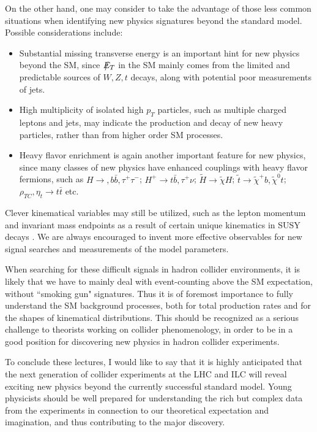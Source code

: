 \documentclass[12pt,prd,aps,floats,preprintnumbers,preprint,superscriptaddress,floatfix,nofootinbib]{revtex4}
\newcommand{ \slashchar }[1]{\setbox0=\hbox{$#1$}   %
   \dimen0=\wd0                                     %
   \setbox1=\hbox{/} \dimen1=\wd1                   %
   \ifdim\dimen0>\dimen1                            %
      \rlap{\hbox to \dimen0{\hfil/\hfil}}          %
      #1                                            %
   \else                                            %
      \rlap{\hbox to \dimen1{\hfil$#1$\hfil}}       %
      /                                             %
   \fi}                                             %
\def\etmiss{\slashchar{E}_{T}}
\def\pt{p_T^{}}
\begin{document}
On the other hand, one  may consider to take the advantage 
of those less common situations when identifying new physics signatures 
beyond the standard model. Possible considerations include:
\begin{itemize}
\item Substantial missing transverse energy is an important hint for new
physics beyond the SM, since $\etmiss$ in the SM  mainly comes from the
limited and predictable sources of $W,Z,t$ decays, 
along with potential poor measurements of jets.
%
\item High multiplicity of isolated high $\pt$ particles, such as multiple 
charged leptons and jets, may indicate the production and decay of
new heavy particles, rather than from higher order SM processes.
\item Heavy flavor enrichment is again another important feature
for new physics, since many  classes of new physics have enhanced
couplings with heavy flavor fermions, such as $H\to, b\bar b, \tau^+\tau^-$; 
$H^+ \to t\bar b, \tau^+\nu$; $\tilde H \to \tilde\chi H$;  
$\tilde t \to \tilde\chi^+ b, \tilde\chi^0 t$;
$\rho^{}_{TC}, \eta_{t}^{} \to t\bar t$ etc.
\end{itemize}
Clever kinematical variables may still be utilized, such as the lepton momentum
and invariant mass endpoints as a result of certain unique kinematics in SUSY
decays \cite{endpoint}.  
We are always encouraged to invent more effective  observables for new
signal searches and measurements of the model parameters. 

When searching for these difficult signals
in hadron collider environments, it is likely that we have
to mainly deal with event-counting above the SM expectation, without
``smoking gun" signatures. Thus it is of
foremost importance to fully understand the SM background 
processes, both for total 
production rates and for the shapes of kinematical distributions. 
This should be recognized as a serious challenge to theorists working
on collider phenomenology, in order to be in a good position for discovering 
new physics in hadron collider experiments.

To conclude these lectures, I would like to say  that it is highly anticipated
that the next generation of collider experiments at the LHC and ILC will
reveal exciting new physics beyond the currently successful standard
model. Young physicists should be well prepared for understanding the
rich but complex data from the experiments in connection to our 
theoretical expectation and imagination,  and thus contributing to the
major discovery. 
 
\end{document}
